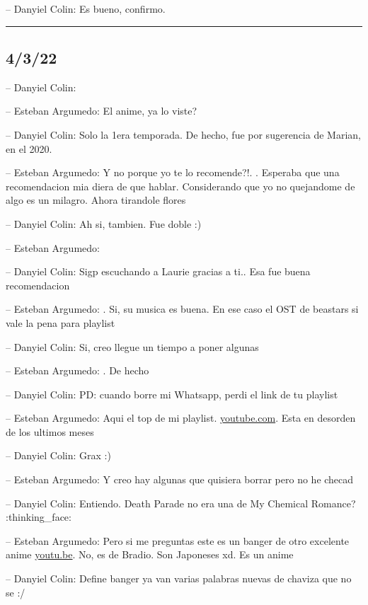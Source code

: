 -- Danyiel Colin: Es bueno, confirmo.

\begin{center}\rule{0.5\linewidth}{0.5pt}\end{center}

\hypertarget{section-47}{%
\subsection{4/3/22}\label{section-47}}

-- Danyiel Colin:

-- Esteban Argumedo: El anime, ya lo viste?

-- Danyiel Colin: Solo la 1era temporada. De hecho, fue por sugerencia
de Marian, en el 2020.

-- Esteban Argumedo: Y no porque yo te lo recomende?!. . Esperaba que
una recomendacion mia diera de que hablar. Considerando que yo no
quejandome de algo es un milagro. Ahora tirandole flores

-- Danyiel Colin: Ah si, tambien. Fue doble :)

-- Esteban Argumedo:

-- Danyiel Colin: Sigp escuchando a Laurie gracias a ti.. Esa fue buena
recomendacion

-- Esteban Argumedo: . Si, su musica es buena. En ese caso el OST de
beastars si vale la pena para playlist

-- Danyiel Colin: Si, creo llegue un tiempo a poner algunas

-- Esteban Argumedo: . De hecho

-- Danyiel Colin: PD: cuando borre mi Whatsapp, perdi el link de tu
playlist

-- Esteban Argumedo: Aqui el top de mi playlist.
\href{https://youtube.com/playlist?list=PLqrrTT1Y5oWFNGfuBF18rdVwOFQTXObKt}{youtube.com}.
Esta en desorden de los ultimos meses

-- Danyiel Colin: Grax :)

-- Esteban Argumedo: Y creo hay algunas que quisiera borrar pero no he
checad

-- Danyiel Colin: Entiendo. Death Parade no era una de My Chemical
Romance? :thinking\_face:

-- Esteban Argumedo: Pero si me preguntas este es un banger de otro
excelente anime \href{https://youtu.be/0YF8vecQWYs}{youtu.be}. No, es de
Bradio. Son Japoneses xd. Es un anime

-- Danyiel Colin: Define banger ya van varias palabras nuevas de chaviza
que no se :/

